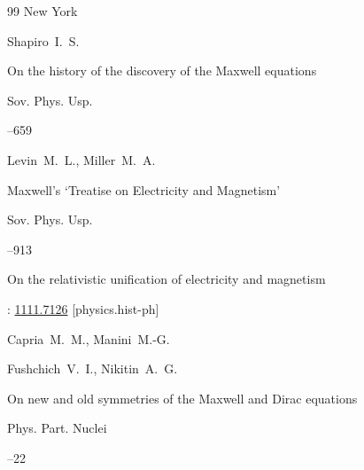 \begin{thebibliography}{99}
\publaddr New York 




\by Shapiro~I.~S.

\paper On the history of the discovery of the Maxwell equations

\jour Sov. Phys. Usp. 



–659 






\by Levin~M.~L., Miller~M.~A.

\paper Maxwell's `Treatise on Electricity and Magnetism'

\jour  Sov. Phys. Usp. 


–913 









\eprint On the relativistic unification of electricity and magnetism 

\arxiv: \href{http://arxiv.org/abs/1111.7126}{1111.7126} [physics.hist-ph]



\by Capria~M.~M., Manini~M.-G.






\by Fushchich~V.~I., Nikitin~A.~G.

\paper On new and old symmetries of the Maxwell and Dirac equations

\jour Phys. Part. Nuclei 



--22 







\end{thebibliography}
